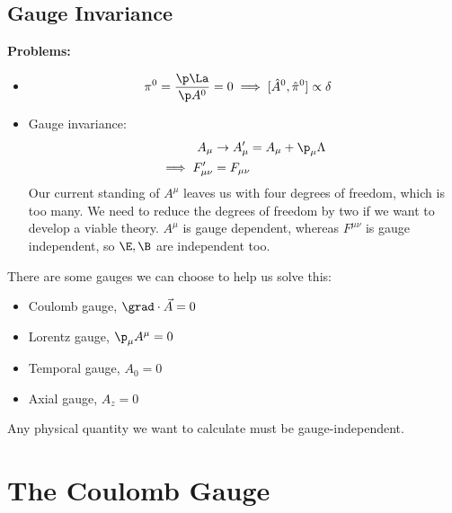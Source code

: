 \documentclass[a4paper, 11pt, normalem]{report}
\newcommand\hpi{\hat{\pi}}
\begin{document}
\section{Gauge Invariance}
\textbf{Problems:}
\begin{itemize}
    \item
        \begin{align}
            \pi^0 &= \frac{\p\La}{\p A^0} = 0 \implies [\hat{A}^0,\hpi^0] \propto \delta
        \end{align}
    \item Gauge invariance:
        \begin{align}
            A_\mu &\to A_\mu' = A_\mu + \p_\mu\Lambda \\
            \implies F_{\mu\nu}' &= F_{\mu\nu}
        \end{align}
        Our current standing of $A^\mu$ leaves us with four degrees of freedom, which is too many.
        We need to reduce the degrees of freedom by two if we want to develop a viable theory.
        $A^\mu$ is gauge dependent, whereas $F^{\mu\nu}$ is gauge independent, so $\E,\B$ are independent too.
\end{itemize}
There are some gauges we can choose to help us solve this:
\begin{itemize}
    \item Coulomb gauge, $\grad\cdot\vec{A} = 0$
    \item Lorentz gauge, $\p_\mu A^\mu = 0$
    \item Temporal gauge, $A_0 = 0$
    \item Axial gauge, $A_z = 0$
\end{itemize}
Any physical quantity we want to calculate must be gauge-independent.

\chapter{The Coulomb Gauge}
\end{document}
